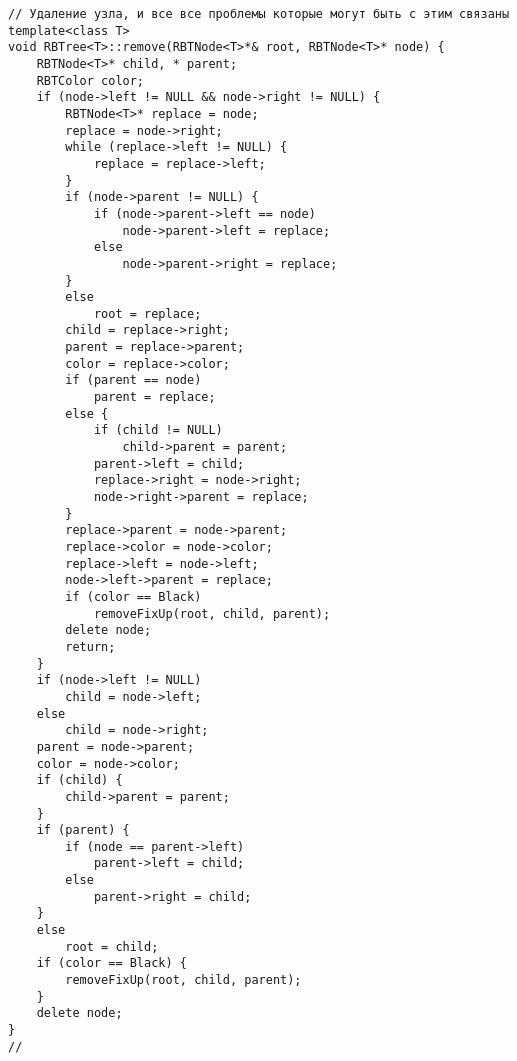 \documentclass[bachelor, och, referat, times]{SCWorks}
\begin{document}
\begin{verbatim}
// Удаление узла, и все все проблемы которые могут быть с этим связаны
template<class T>
void RBTree<T>::remove(RBTNode<T>*& root, RBTNode<T>* node) {
    RBTNode<T>* child, * parent;
    RBTColor color;
    if (node->left != NULL && node->right != NULL) {
        RBTNode<T>* replace = node;
        replace = node->right;
        while (replace->left != NULL) {
            replace = replace->left;
        }
        if (node->parent != NULL) {
            if (node->parent->left == node)
                node->parent->left = replace;
            else
                node->parent->right = replace;
        }
        else
            root = replace;
        child = replace->right;
        parent = replace->parent;
        color = replace->color;
        if (parent == node)
            parent = replace;
        else {
            if (child != NULL)
                child->parent = parent;
            parent->left = child;
            replace->right = node->right;
            node->right->parent = replace;
        }
        replace->parent = node->parent;
        replace->color = node->color;
        replace->left = node->left;
        node->left->parent = replace;
        if (color == Black)
            removeFixUp(root, child, parent);
        delete node;
        return;
    }
    if (node->left != NULL)
        child = node->left;
    else
        child = node->right;
    parent = node->parent;
    color = node->color;
    if (child) {
        child->parent = parent;
    }
    if (parent) {
        if (node == parent->left)
            parent->left = child;
        else
            parent->right = child;
    }
    else
        root = child;
    if (color == Black) {
        removeFixUp(root, child, parent);
    }
    delete node;
}
//


\end{verbatim}
\end{document}
